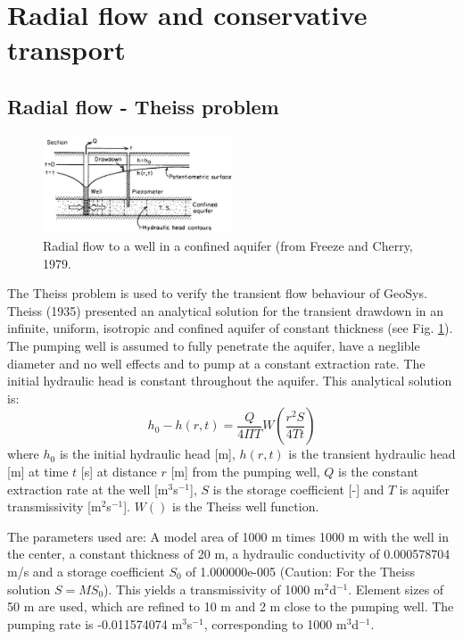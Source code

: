 \section{Radial flow and conservative transport}

\subsection{Radial flow - Theiss problem }

\begin{figure}[htbp]
\centering
\includegraphics[width=0.5\textwidth]{C/figures/radial_flow_theiss_setup.eps}
\caption{Radial flow to a well in a confined aquifer (from Freeze and Cherry, 1979.}
\label{radial_flow_theiss_setup}
\end{figure}
The Theiss problem is used to verify the transient flow behaviour of GeoSys. Theiss (1935) presented an analytical solution for the transient drawdown in an infinite, uniform, isotropic and confined aquifer  of constant thickness (see Fig. \ref{radial_flow_theiss_setup}). The pumping well is assumed to fully penetrate the aquifer, have a neglible diameter and no well effects and to pump at a constant extraction rate. The initial hydraulic head is constant throughout the aquifer. This analytical solution is:
\begin{equation}
h_0 - h(r,t) = \frac{Q}{4\Pi T} W(\frac{r^2S}{4Tt})
\end{equation}
where $h_0$ is the initial hydraulic head [m], $h(r,t)$ is the transient hydraulic head [m] at time $t$ [s] at distance $r$ [m] from the pumping well, $Q$ is the constant extraction rate at the well [m$^3$s$^{-1}$], $S$ is the storage coefficient [-] and $T$ is aquifer transmissivity [m$^2$s$^{-1}$]. $W()$ is the Theiss well function.

The parameters used are: A model area of 1000 m times 1000 m with the well in the center, a constant thickness of 20 m, a hydraulic conductivity of 0.000578704 m/s and a storage coefficient $S_0$ of 1.000000e-005 (Caution: For the Theiss solution $S=M S_0$). This yields a transmissivity of 1000 m$^2$d$^{-1}$. Element sizes of 50 m are used, which are refined to 10 m and 2 m close to the pumping well. The pumping rate is -0.011574074 m$^{3}$s$^{-1}$, corresponding to 1000 m$^3$d$^{-1}$.

